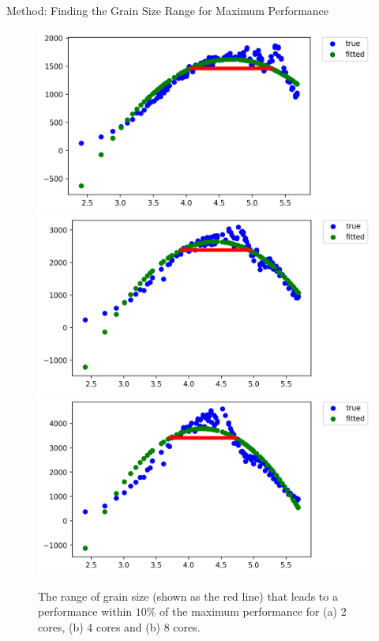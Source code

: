 \documentclass[10pt]{beamer}
\begin{document}
\begin{frame}{Method: Finding the Grain Size Range for Maximum Performance}
	\begin{outline}
\begin{figure}[H]
	\centering
	{\includegraphics[scale=.3]{images/polyfit/fig_690_total_2_range.png}\label{fig12:a}}
	{\includegraphics[scale=.3]{images/polyfit/fig_690_total_4_range.png}\label{fig12:b}}
	{\includegraphics[scale=.3]{images/polyfit/fig_690_total_8_range.png}\label{fig12:c}}
	\caption{The range of grain size (shown as the red line) that leads to a performance within $10\%$ of the maximum performance for (a) 2 cores, (b) 4 cores and (b) 8 cores.}	
	\label{fig12}
\end{figure}
	\end{outline}
\end{frame}
\end{document}
